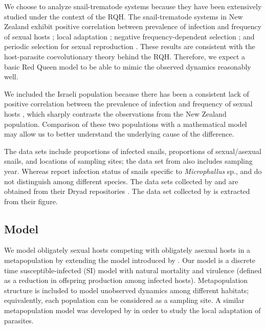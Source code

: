\documentclass{article}\usepackage[]{graphicx}\usepackage[]{color}
\begin{document}
We choose to analyze snail-trematode systems because they have been extensively studied under the context of the RQH.
The snail-trematode systems in New Zealand exhibit positive correlation between prevalence of infection and frequency of sexual hosts \citep{lively2002temporal, king2011parasites, vergara2013geographic, mckone2016fine, gibson2016within}; local adaptation \citep{lively1989adaptation, lively2004host, king2011coevolutionary}; negative frequency-dependent selection \citep{dybdahl1995host, dybdahl1998host,jokela2009maintenance, koskella2009evidence}; and periodic selection for sexual reproduction \citep{vergara2014infection, gibson2018periodic}. 
These results are consistent with the host-parasite coevolutionary theory behind the RQH.
Therefore, we expect a basic Red Queen model to be able to mimic the observed dynamics reasonably well.

We included the Israeli population because there has been a consistent lack of positive correlation between the prevalence of infection and frequency of sexual hosts \citep{heller1990sexual, ben2005spatial, ben2007temporal, ben2008sex, dagan2013clonal}, which sharply contrasts the observations from the New Zealand population.
Comparison of these two populations with a mathematical model may allow us to better understand the underlying cause of the difference.

The data sets include proportions of infected snails, proportions of sexual/asexual snails, and locations of sampling sites; the data set from \cite{vergara2014infection} also includes sampling year.
Whereas \cite{vergara2014infection} report infection status of snails specific to \textit{Microphallus} sp., \cite{mckone2016fine} and \cite{dagan2013clonal} do not distinguish among different species.
The data sets collected by \cite{dagan2013clonal} and \cite{vergara2014infection} are obtained from their Dryad repositories \citep{dryad_f5t56, dryad_29nk3_2}. 
The data set collected by \cite{mckone2016fine} is extracted from their figure.

\subsection{Model}

We model obligately sexual hosts competing with obligately asexual hosts in a metapopulation by extending the model introduced by \cite{lively2010epidemiological}.
Our model is a discrete time susceptible-infected (SI) model with natural mortality and virulence (defined as a reduction in offspring production among infected hosts).
Metapopulation structure is included to model unobserved dynamics among different habitats; equivalently, each population can be considered as a sampling site.
A similar metapopulation model was developed by \cite{lively2018habitat} in order to study the local adaptation of parasites.
\end{document}
